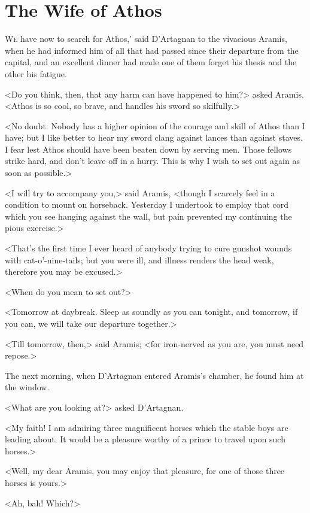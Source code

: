 
\chapter{The Wife of Athos}

\lettrine[,ante=`]{W}{e} have now to search for Athos,' said D'Artagnan to the vivacious Aramis, when he had informed him of all that had passed since their departure from the capital, and an excellent dinner had made one of them forget his thesis and the other his fatigue. 

<Do you think, then, that any harm can have happened to him?> asked Aramis. <Athos is so cool, so brave, and handles his sword so skilfully.> 

<No doubt. Nobody has a higher opinion of the courage and skill of Athos than I have; but I like better to hear my sword clang against lances than against staves. I fear lest Athos should have been beaten down by serving men. Those fellows strike hard, and don't leave off in a hurry. This is why I wish to set out again as soon as possible.> 

<I will try to accompany you,> said Aramis, <though I scarcely feel in a condition to mount on horseback. Yesterday I undertook to employ that cord which you see hanging against the wall, but pain prevented my continuing the pious exercise.> 

<That's the first time I ever heard of anybody trying to cure gunshot wounds with cat-o'-nine-tails; but you were ill, and illness renders the head weak, therefore you may be excused.> 

<When do you mean to set out?> 

<Tomorrow at daybreak. Sleep as soundly as you can tonight, and tomorrow, if you can, we will take our departure together.> 

<Till tomorrow, then,> said Aramis; <for iron-nerved as you are, you must need repose.> 

The next morning, when D'Artagnan entered Aramis's chamber, he found him at the window. 

<What are you looking at?> asked D'Artagnan. 

<My faith! I am admiring three magnificent horses which the stable boys are leading about. It would be a pleasure worthy of a prince to travel upon such horses.> 

<Well, my dear Aramis, you may enjoy that pleasure, for one of those three horses is yours.> 

<Ah, bah! Which?> 


